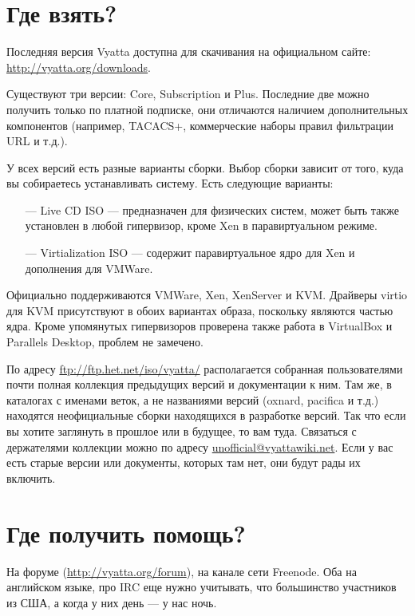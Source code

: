 \documentclass[a4paper,12pt, twoside, russian]{report}
\begin{document}
\section{Где взять?}
Последняя версия Vyatta доступна для скачивания на официальном сайте: 
\url{http://vyatta.org/downloads}.

Существуют три версии: Core, Subscription и Plus. Последние две можно получить только по платной подписке,
они отличаются наличием дополнительных компонентов (например, TACACS+, коммерческие наборы правил фильтрации URL и т.д.).

У всех версий есть разные варианты сборки. Выбор сборки зависит от того, куда вы собираетесь устанавливать 
систему. Есть следующие варианты:
\begin{itemize}
 \item[---] Live CD ISO --- предназначен для физических систем, может быть также установлен в любой
            гипервизор, кроме Xen в паравиртуальном режиме.
 \item[---] Virtialization ISO --- содержит паравиртуальное ядро для Xen и дополнения для VMWare.
\end{itemize}

Официально поддерживаются VMWare, Xen, XenServer и KVM. Драйверы virtio для KVM присутствуют в обоих вариантах образа,
поскольку являются частью ядра. Кроме упомянутых гипервизоров проверена также работа в VirtualBox и Parallels Desktop, проблем не замечено.

По адресу \url{ftp://ftp.het.net/iso/vyatta/} располагается собранная пользователями почти полная коллекция предыдущих версий и
документации к ним. Там же, в каталогах с именами веток, а не названиями версий (oxnard, pacifica и т.д.) находятся неофициальные
сборки находящихся в разработке версий. Так что если вы хотите заглянуть в прошлое или в будущее, то вам туда. Связаться с
держателями коллекции можно по адресу \href{mailto:unofficial@vyattawiki.net}{unofficial@vyattawiki.net}. Если у вас есть старые версии или документы, которых там нет,
они будут рады их включить.

\section{Где получить помощь?}
На форуме (\url{http://vyatta.org/forum}), на канале  сети Freenode. Оба на 
английском языке, про IRC еще нужно учитывать, что большинство участников из США, 
а когда у них день --- у нас ночь.
\end{document}
